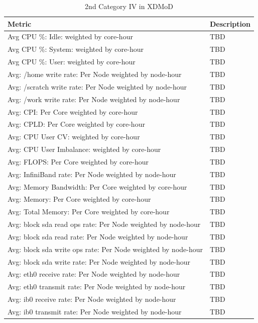 \documentclass{sig-alternate-05-2015}
\begin{document}
\begin{table}[htb]
  \caption{2nd Category IV in XDMoD}
\begin{scriptsize}
\label{T:xdmod24}
 \begin{tabular}{l|l} 
Metric & Description \\
\hline
Avg CPU \%: Idle: weighted by core-hour &  TBD \\
Avg CPU \%: System: weighted by core-hour &  TBD \\
Avg CPU \%: User: weighted by core-hour &  TBD \\
Avg: /home write rate: Per Node weighted by node-hour &  TBD \\
Avg: /scratch write rate: Per Node weighted by node-hour &  TBD \\
Avg: /work write rate: Per Node weighted by node-hour &  TBD \\
Avg: CPI: Per Core weighted by core-hour &  TBD \\
Avg: CPLD: Per Core weighted by core-hour &  TBD \\
Avg: CPU User CV: weighted by core-hour &  TBD \\
Avg: CPU User Imbalance: weighted by core-hour &  TBD \\
Avg: FLOPS: Per Core weighted by core-hour &  TBD \\
Avg: InfiniBand rate: Per Node weighted by node-hour &  TBD \\
Avg: Memory Bandwidth: Per Core weighted by core-hour &  TBD \\
Avg: Memory: Per Core weighted by core-hour &  TBD \\
Avg: Total Memory: Per Core weighted by core-hour &  TBD \\
Avg: block sda read ops rate: Per Node weighted by node-hour &  TBD \\
Avg: block sda read rate: Per Node weighted by node-hour &  TBD \\
Avg: block sda write ops rate: Per Node weighted by node-hour &  TBD \\
Avg: block sda write rate: Per Node weighted by node-hour &  TBD \\
Avg: eth0 receive rate: Per Node weighted by node-hour &  TBD \\
Avg: eth0 transmit rate: Per Node weighted by node-hour &  TBD \\
Avg: ib0 receive rate: Per Node weighted by node-hour &  TBD \\
Avg: ib0 transmit rate: Per Node weighted by node-hour &  TBD \\

\end{tabular}
\end{scriptsize}
\end{table}
\end{document}
